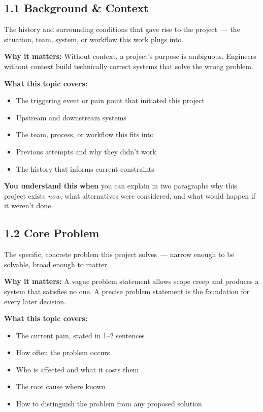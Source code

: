 \subsection*{1.1 Background \& Context}\label{project-planning-guide:11-background--context}

The history and surrounding conditions that gave rise to the project~--- the situation, team, system, or workflow this work plugs into.

\textbf{Why it matters:} Without context, a project's purpose is ambiguous. Engineers without context build technically correct systems that solve the wrong problem.

\textbf{What this topic covers:}

\begin{itemize}
\tightlist
\item
  The triggering event or pain point that initiated this project
\item
  Upstream and downstream systems
\item
  The team, process, or workflow this fits into
\item
  Previous attempts and why they didn't work
\item
  The history that informs current constraints
\end{itemize}

\noindent{}\textbf{You understand this when} you can explain in two paragraphs why this project exists \emph{now}, what alternatives were considered, and what would happen if it weren't done.

\subsection*{1.2 Core Problem}\label{project-planning-guide:12-core-problem}

The specific, concrete problem this project solves~--- narrow enough to be solvable, broad enough to matter.

\textbf{Why it matters:} A vague problem statement allows scope creep and produces a system that satisfies no one. A precise problem statement is the foundation for every later decision.

\textbf{What this topic covers:}

\begin{itemize}
\tightlist
\item
  The current pain, stated in 1--2 sentences
\item
  How often the problem occurs
\item
  Who is affected and what it costs them
\item
  The root cause where known
\item
  How to distinguish the problem from any proposed solution
\end{itemize}

